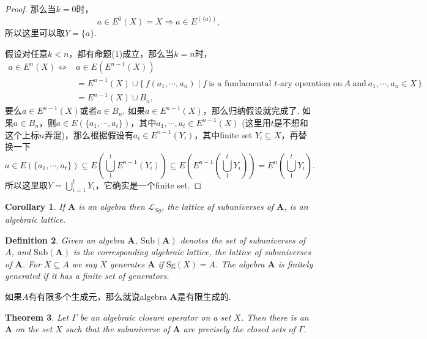 \documentclass{article}
\newtheorem{theorem}{Theorem}[section]
\newtheorem{corollary}[theorem]{Corollary}
\newtheorem{definition}[theorem]{Definition}
\newcommand\Set[2]{\{\,#1\mid#2\,\}} %
\newcommand\Sg{\text{Sg}}
\newcommand\algebra{\mathbf{A}}
\newcommand\Sub[1]{\text{Sub}(#1)}
\begin{document}
\begin{proof}
那么当$k=0$时，
$$
a \in E^0(X) = X  \Rightarrow a \in E^(\{a\}),
$$
所以这里可以取$Y = \{a\}$.

假设对任意$k < n$，都有命题(1)成立，那么当$k=n$时，
$$
\begin{aligned}
a \in E^n(X) \Leftrightarrow& a \in E(E^{n-1}(X))\\ &= E^{n-1}(X) \cup \Set{f(a_1,\cdots,a_n)}{f\ \text{is a fundamental $t$-ary operation on}\ A\ \text{and}\ a_1,\cdots,a_n \in X}\\ &= E^{n-1}(X) \cup B_n,
\end{aligned}
$$
要么$a \in E^{n-1}(X)$或者$a \in B_n$. 如果$a \in E^{n-1}(X)$，那么归纳假设就完成了. 如果$a \in B_n$，则$a \in E(\{a_1,\cdots,a_t\})$，其中$a_1,\cdots,a_t \in E^{n-1}(X)$ (这里用$t$是不想和这个上标$n$弄混)，那么根据假设有$a_i \in E^{n-1}(Y_i)$，其中finite set $Y_i \subseteq X$，再替换一下
$$
a \in E(\{a_1,\cdots,a_t\}) \subseteq  E(\bigcup\limits_{1}^{t} E^{n-1}(Y_i))  \subseteq E(E^{n-1}(\bigcup\limits_{1}^{t} Y_i)) = E^n(\bigcup\limits_{1}^{t} Y_i).
$$
所以这里取$Y = \bigcup\limits_{i=1}^{t} Y_i$，它确实是一个finite set.

\end{proof}

\begin{corollary}
\rm If $\mathbf{A}$ is an algebra then $\mathcal{L}_{Sg}$, the lattice of subuniverses of $\mathbf{A}$, is an algebraic lattice.
\end{corollary}

\newpage
\begin{definition}
\rm Given an algebra $\algebra$, {\color{red} $\Sub{\algebra}$} denotes the set of subuniverses of $A$, and $\Sub{\algebra}$ is the corresponding algebraic lattice, the lattice of subuniverses of $\algebra$. For $X \subseteq A$ we say $X$ generates $\algebra$ if $\Sg(X) = A$. The algebra $\algebra$ is finitely generated if it has a finite set of generators.
\end{definition}

{\color{blue} 如果$A$有有限多个生成元，那么就说algebra $\algebra$是有限生成的}.


\begin{theorem}
\rm Let $\Gamma$ be an algebraic closure operator on a set $X$. Then there is an $\algebra$ on the set $X$ such that the subuniverse of $\algebra$ are precisely the closed sets of $\Gamma$.
\end{theorem}
\end{document}
